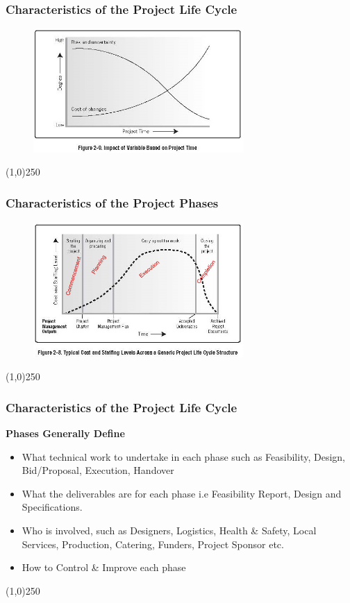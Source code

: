 \begin{frame}
\frametitle{Characteristics of the Project Life Cycle}
 \begin{figure}
 	\centering
 		\includegraphics[width = 8cm]{images/Fig2-9.jpg}
 	\label{fig:2-9}
 \end{figure}
\end{frame}
\begin{center}\line(1,0){250}\end{center}



\begin{frame}
\frametitle{Characteristics of the Project Phases}
 \begin{figure}
 	\centering
 		\includegraphics[width = 8cm]{images/Fig2-8edit.jpg}
 	\label{fig:2-8edit}
 \end{figure}
\end{frame}
\begin{center}\line(1,0){250}\end{center}



\begin{frame}
\frametitle{Characteristics of the Project Life Cycle}
\textbf{Phases Generally Define}\\
\begin{itemize}
	\item What technical work to undertake in each phase such as Feasibility, Design, Bid/Proposal, Execution, Handover
	\item What the deliverables are for each phase i.e Feasibility Report, Design and Specifications.
	\item Who is involved, such as Designers, Logistics, Health \& Safety, Local Services, Production, Catering, Funders, Project Sponsor etc.
	\item How to Control \& Improve each phase
\end{itemize}
\end{frame}
\begin{center}\line(1,0){250}\end{center}



